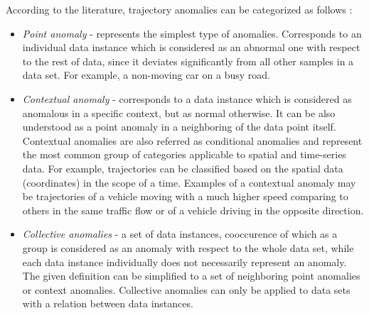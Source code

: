 According to the literature, trajectory anomalies can be categorized as follows \cite{article:15_survey_ad}\cite{article:6_survey_anom_det_rtuvs}\cite{article:comp_analys_odt}:
\begin{itemize}
	\item \textit{Point anomaly} - represents the simplest type of anomalies. Corresponds to an individual data instance which is considered as an abnormal one with respect to the rest of data, since it deviates significantly from all other samples in a data set. For example, a non-moving car on a busy road.
	\item \textit{Contextual anomaly} - corresponds to a data instance which is considered as anomalous in a specific context, but as normal otherwise. It can be also understood as a point anomaly in a neighboring of the data point itself. Contextual anomalies are also referred as conditional anomalies and represent the most common group of categories applicable to spatial and time-series data. For example, trajectories can be classified based on the spatial data (coordinates) in the scope of a time. Examples of a contextual anomaly may be trajectories of a vehicle moving with a much higher speed comparing to others in the same traffic flow or of a vehicle driving in the opposite direction.
	\item \textit{Collective anomalies} - a set of data instances, cooccurence of which as a group is considered as an anomaly with respect to the whole data set, while each data instance individually does not necessarily represent an anomaly. The given definition can be simplified to a set of neighboring point anomalies or context anomalies. Collective anomalies can only be applied to data sets with a relation between data instances.
\end{itemize}
 
